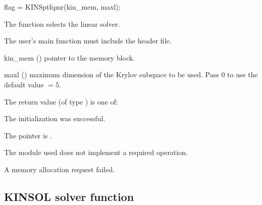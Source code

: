 {}
{
  flag = KINSptfqmr(kin\_mem, maxl);
}
{
  The function  selects the {\kinsptfqmr} linear solver.

  The user's main function must include the  header file.
}
{
  \begin{args}
  \item[kin\_mem] ()
    pointer to the {\kinsol} memory block.
  \item[maxl] ()
    maximum dimension of the Krylov subspace to be used. Pass $0$ to use the 
    default value $=5$.
  \end{args}
}
{
  The return value  (of type ) is one of:
  \begin{args}
  \item[\Id{KINSPILS\_SUCCESS}] 
    The {\kinsptfqmr} initialization was successful.
  \item[\Id{KINSPILS\_MEM\_NULL}]
    The  pointer is .
  \item[\Id{KINSPILS\_ILL\_INPUT}]
    The {\nvector} module used does not implement a required operation.
  \item[\Id{KINSPILS\_MEM\_FAIL}]
    A memory allocation request failed.
  \end{args}
}
{}

\subsection{KINSOL solver function}\label{sss:kinsol}

